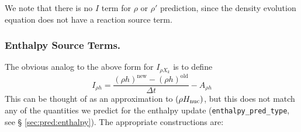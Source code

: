 We note that there is no $I$ term for $\rho$ or $\rho'$ prediction, since
the density evolution equation does not have a reaction source term.

\subsubsection{Enthalpy Source Terms.}
The obvious analog to the above form for $I_{\rho X_k}$ is to define
\begin{equation}
I_{\rho h}  = \frac{(\rho h)^\mathrm{new} - (\rho h)^\mathrm{old}}{\Delta t} - A_{\rho h}
\label{eq:sdc:Irhoh}
\end{equation}
This can be thought of as an approximation to $(\rho {H_{\rm nuc}})$,
but this does not match any of the quantities we predict for the
enthalpy update ({\tt enthalpy\_pred\_type}, see \S
\ref{sec:pred:enthalpy}).  The appropriate constructions
are:

